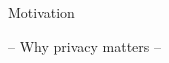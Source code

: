 \begin{frame}{Motivation}
    \begin{center}
        -- Why privacy matters --
    \end{center}
\end{frame}